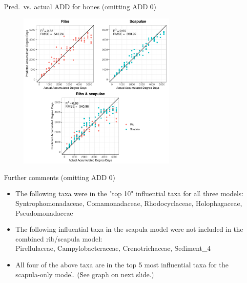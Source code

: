\documentclass{beamer}
\begin{document}
\begin{frame}{Pred.\ vs. actual ADD for bones (omitting ADD 0)}

  \begin{center}
    \begin{figure}
      \includegraphics[height=3.1in]
        {w_bones/bacteria/use_families/hl_combined_family_no_baseline_predicted_vs_actual_ADD}
    \end{figure}
  \end{center}
    
\end{frame}




\begin{frame}{Further comments (omitting ADD 0)}
  
  \begin{itemize}
    \item The following taxa were in the "top 10" influential taxa for all
    three models:\\
    Syntrophomonadaceae, Comamonadaceae, Rhodocyclaceae, Holophagaceae,
    Pseudomonadaceae
    \item The following influential taxa in the scapula model were not included
    in the combined rib/scapula model:\\
    Pirellulaceae, Campylobacteraceae, Crenotrichaceae, Sediment\_4
    \item All four of the above taxa are in the top 5 most influential taxa for
    the scapula-only model.  (See graph on next slide.)
    
  \end{itemize}

\end{frame}
\end{document}
